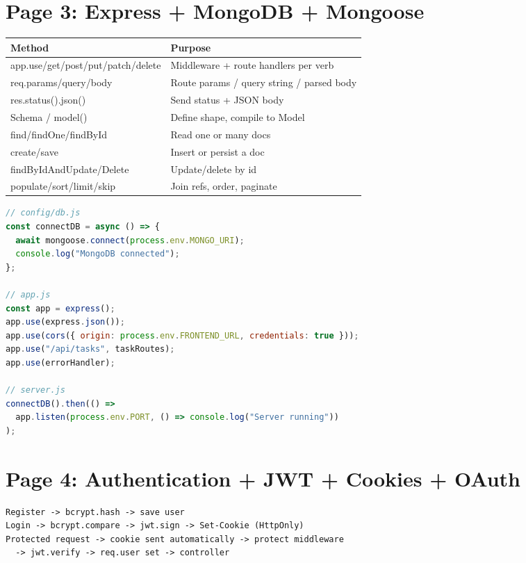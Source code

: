 \newpage
\section*{Page 3: Express + MongoDB + Mongoose}

\begin{tabularx}{\textwidth}{@{}>{\ttfamily}p{4.3cm}X@{}}
\toprule
Method & Purpose \\
\midrule
app.use/get/post/put/patch/delete & Middleware + route handlers per verb \\
req.params/query/body & Route params / query string / parsed body \\
res.status().json() & Send status + JSON body \\
Schema / model() & Define shape, compile to Model \\
find/findOne/findById & Read one or many docs \\
create/save & Insert or persist a doc \\
findByIdAndUpdate/Delete & Update/delete by id \\
populate/sort/limit/skip & Join refs, order, paginate \\
\bottomrule
\end{tabularx}

\begin{lstlisting}[language=JavaScript]
// config/db.js
const connectDB = async () => {
  await mongoose.connect(process.env.MONGO_URI);
  console.log("MongoDB connected");
};

// app.js
const app = express();
app.use(express.json());
app.use(cors({ origin: process.env.FRONTEND_URL, credentials: true }));
app.use("/api/tasks", taskRoutes);
app.use(errorHandler);

// server.js
connectDB().then(() =>
  app.listen(process.env.PORT, () => console.log("Server running"))
);
\end{lstlisting}

\newpage
\section*{Page 4: Authentication + JWT + Cookies + OAuth}

\begin{diagrambox}
\begin{verbatim}
Register -> bcrypt.hash -> save user
Login -> bcrypt.compare -> jwt.sign -> Set-Cookie (HttpOnly)
Protected request -> cookie sent automatically -> protect middleware
  -> jwt.verify -> req.user set -> controller
\end{verbatim}
\end{diagrambox}

